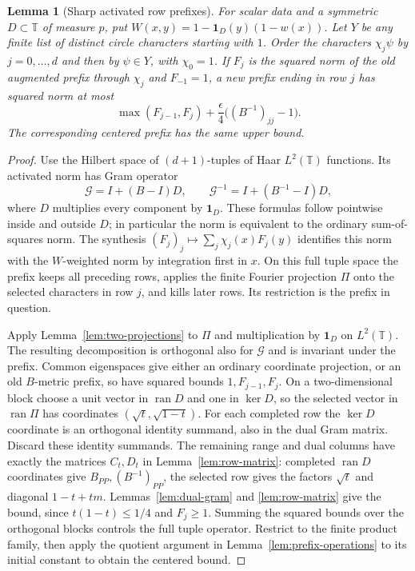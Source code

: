 \documentclass[reqno,a4paper,12pt]{amsart}
\newtheorem{lemma}[theorem]{Lemma}
\theoremstyle{definition}
\newcommand{\T}{\mathbb T}
\newcommand{\ran}{\operatorname{ran}}
\begin{document}
\begin{lemma}[Sharp activated row prefixes]\label{lem:row-split}
For scalar data and a symmetric $D\subset\T$ of measure $p$, put
$W(x,y)=1-\mathbf1_D(y)(1-w(x))$.
Let $Y$ be any finite list of distinct circle characters starting with
$1$. Order the characters $\chi_j\psi$ by $j=0,\ldots,d$ and then by
$\psi\in Y$, with $\chi_0=1$.
If $F_j$ is the squared norm of the old augmented prefix through
$\chi_j$ and $F_{-1}=1$, a new prefix ending in row $j$ has squared
norm at most
\[
 \max(F_{j-1},F_j)+\frac{\epsilon}{4}\bigl((B^{-1})_{jj}-1\bigr).
\]
The corresponding centered prefix has the same upper bound.
\end{lemma}
\begin{proof}
Use the Hilbert space of $(d+1)$-tuples of Haar $L^2(\T)$ functions.
Its activated norm has Gram operator
\[
 \mathcal G=I+(B-I)D,\qquad
 \mathcal G^{-1}=I+(B^{-1}-I)D,
\]
where $D$ multiplies every component by $\mathbf1_D$.
These formulas follow pointwise inside and outside $D$; in particular
the norm is equivalent to the ordinary sum-of-squares norm.
The synthesis $(F_j)_j\mapsto\sum_j\chi_j(x)F_j(y)$ identifies this
norm with the $W$-weighted norm by integration first in $x$.
On this full tuple space the prefix keeps all preceding rows, applies
the finite Fourier projection $\Pi$ onto the selected characters in
row $j$, and kills later rows. Its restriction is the prefix in question.

Apply Lemma~\ref{lem:two-projections} to $\Pi$ and multiplication by
$\mathbf1_D$ on $L^2(\T)$. The resulting decomposition is orthogonal
also for $\mathcal G$ and is invariant under the prefix.
Common eigenspaces give either an ordinary coordinate projection,
or an old $B$-metric prefix, so have squared bounds
$1,F_{j-1},F_j$.
On a two-dimensional block choose a unit vector in $\ran D$ and one
in $\ker D$, so the selected vector in $\ran\Pi$ has coordinates
$(\sqrt t,\sqrt{1-t})$. For each completed row the $\ker D$ coordinate
is an orthogonal identity summand, also in the dual Gram matrix.
Discard these identity summands. The remaining range and dual columns
have exactly the matrices $C_t,D_t$ in Lemma~\ref{lem:row-matrix}:
completed $\ran D$ coordinates give $B_{PP},(B^{-1})_{PP}$, the
selected row gives the factors $\sqrt t$ and diagonal $1-t+tm$.
Lemmas~\ref{lem:dual-gram} and \ref{lem:row-matrix} give the bound,
since $t(1-t)\le1/4$ and $F_j\ge1$.
Summing the squared bounds over the orthogonal blocks controls the
full tuple operator. Restrict to the finite product family, then apply
the quotient argument in Lemma~\ref{lem:prefix-operations} to its
initial constant to obtain the centered bound.
\end{proof}
\end{document}
